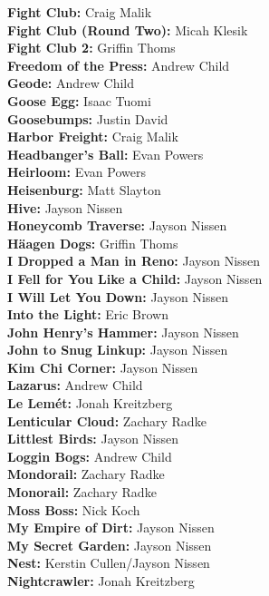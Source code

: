 \begin{flushleft}
\textbf{Fight Club:} Craig Malik\\
\textbf{Fight Club (Round Two):} Micah Klesik\\
\textbf{Fight Club 2:} Griffin Thoms\\
\textbf{Freedom of the Press:} Andrew Child\\
\textbf{Geode:} Andrew Child\\
\textbf{Goose Egg:} Isaac Tuomi\\
\textbf{Goosebumps:} Justin David\\
\textbf{Harbor Freight:} Craig Malik\\
\textbf{Headbanger's Ball:} Evan Powers\\
\textbf{Heirloom:} Evan Powers\\
\textbf{Heisenburg:} Matt Slayton\\
\textbf{Hive:} Jayson Nissen\\
\textbf{Honeycomb Traverse:} Jayson Nissen\\
\textbf{Häagen Dogs:} Griffin Thoms\\
\textbf{I Dropped a Man in Reno:} Jayson Nissen\\
\textbf{I Fell for You Like a Child:} Jayson Nissen\\
\textbf{I Will Let You Down:} Jayson Nissen\\
\textbf{Into the Light:} Eric Brown\\
\textbf{John Henry's Hammer:} Jayson Nissen\\
\textbf{John to Snug Linkup:} Jayson Nissen\\
\textbf{Kim Chi Corner:} Jayson Nissen\\
\textbf{Lazarus:} Andrew Child\\
\textbf{Le Lemét:} Jonah Kreitzberg\\
\textbf{Lenticular Cloud:} Zachary Radke\\
\textbf{Littlest Birds:} Jayson Nissen\\
\textbf{Loggin Bogs:} Andrew Child\\
\textbf{Mondorail:} Zachary Radke\\
\textbf{Monorail:} Zachary Radke\\
\textbf{Moss Boss:} Nick Koch\\
\textbf{My Empire of Dirt:} Jayson Nissen\\
\textbf{My Secret Garden:} Jayson Nissen\\
\textbf{Nest:} Kerstin Cullen/Jayson Nissen\\
\textbf{Nightcrawler:} Jonah Kreitzberg\\

\end{flushleft}
